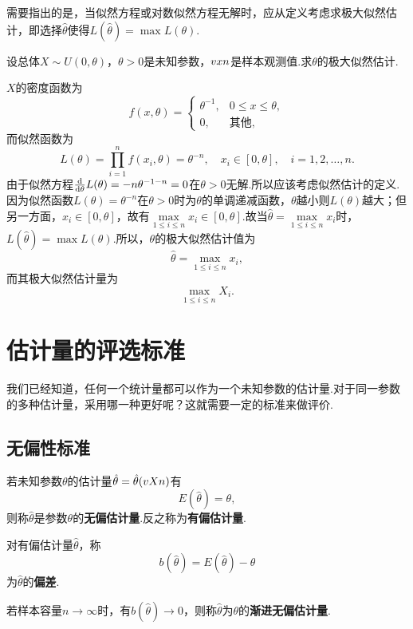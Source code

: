 需要指出的是，当似然方程或对数似然方程无解时，应从定义考虑求极大似然估计，即选择\(\hat{\theta}\)使得\(L(\hat{\theta})=\max L(\theta)\).

\begin{example}
设总体\(X \sim U(0,\theta)\)，\(\theta>0\)是未知参数，\(v{x}{n}\)是样本观测值.求\(\theta\)的极大似然估计.
\begin{solution}
\(X\)的密度函数为\[
f(x,\theta) = \left\{ \begin{array}{cl}
\theta^{-1}, & 0 \leqslant x \leqslant \theta, \\
0, & \text{其他},
\end{array} \right.
\]而似然函数为\[
L(\theta) = \prod\limits_{i=1}^n{f(x_i,\theta)} = \theta^{-n},
\quad x_i \in [0,\theta], \quad i=1,2,\dotsc,n.
\]由于似然方程\(\dv{\theta} L(\theta) = -n\theta^{-1-n} = 0\)在\(\theta>0\)无解.所以应该考虑似然估计的定义.因为似然函数\(L(\theta)=\theta^{-n}\)在\(\theta>0\)时为\(\theta\)的单调递减函数，\(\theta\)越小则\(L(\theta)\)越大；但另一方面，\(x_i\in[0,\theta]\)，故有\(\max\limits_{1 \leqslant i \leqslant n} x_i \in [0,\theta]\).故当\(\hat{\theta}=\max\limits_{1 \leqslant i \leqslant n} x_i\)时，\(L(\hat{\theta})=\max L(\theta)\).所以，\(\theta\)的极大似然估计值为\[
\hat{\theta} = \max\limits_{1 \leqslant i \leqslant n} x_i,
\]而其极大似然估计量为\[
\max\limits_{1 \leqslant i \leqslant n} X_i.
\]
\end{solution}
\end{example}

\section{估计量的评选标准}
我们已经知道，任何一个统计量都可以作为一个未知参数的估计量.对于同一参数的多种估计量，采用哪一种更好呢？这就需要一定的标准来做评价.

\subsection{无偏性标准}
\begin{definition}
若未知参数\(\theta\)的估计量\(\hat{\theta}=\hat{\theta}(v{X}{n})\)有\[
E(\hat{\theta})=\theta,
\]则称\(\hat{\theta}\)是参数\(\theta\)的\textbf{无偏估计量}.反之称为\textbf{有偏估计量}.

对有偏估计量\(\hat{\theta}\)，称\[
b(\hat{\theta}) = E(\hat{\theta}) - \theta
\]为\(\hat{\theta}\)的\textbf{偏差}.

若样本容量\(n\to\infty\)时，有\(b(\hat{\theta})\to0\)，则称\(\hat{\theta}\)为\(\theta\)的\textbf{渐进无偏估计量}.
\end{definition}

